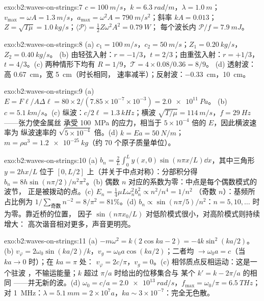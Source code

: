 \begin{solution}{exo:b2:waves-on-strings:7}
$c = \qty{100}{m/s}$，$k = \qty{6.3}{rad/m}$，$\lambda = \qty{1.0}{m}$；$v_{\max} = \omega A =
\qty{1.3}{m/s}$，$a_{\max} = \omega^2A = \qty{790}{m/s^2}$；斜率 $kA = 0.013$；$Z =
\sqrt{T\mu} = \qty{1.0}{kg/s}$；$\langle\mathcal P\rangle = \tfrac12Z\omega^2A^2 = \qty{0.79}{W}$；
每个波长内 $\mathcal P/f = \qty{7.9}{mJ}$。
\end{solution}

\begin{solution}{exo:b2:waves-on-strings:8}
(a) $c_1 = \qty{100}{m/s}$，$c_2 = \qty{50}{m/s}$；$Z_1 = \qty{0.20}{kg/s}$，$Z_2 = \qty{0.40}{kg/s}$。
(b) 由轻弦入射：$r = -1/3$，$t = 2/3$；由重弦入射：$r =
+1/3$，$t = 4/3$。(c) 两种情形下均有 $R = 1/9$，$\mathcal T = 4 \times 0.08/0.36 = 8/9$。
(d) 透射波：高 \qty{0.67}{cm}，宽 \qty{5}{cm}（时长相同，
速率减半）；反射波：\qty{-0.33}{cm}，\qty{10}{cm}。
\end{solution}

\begin{solution}{exo:b2:waves-on-strings:9}
(a) $E = F\ell/A\Delta\ell = 80 \times 2/(7.85 \times 10^{-7} \times 10^{-3}) = \qty{2.0e11}{Pa}$。
(b) $c = \qty{5.1}{km/s}$。(c) 纵波：$c/2\ell = \qty{1.3}{kHz}$；横波
$\sqrt{T/\mu} = \qty{114}{m/s}$，$f = \qty{29}{Hz}$ ——张力使金属丝
承受 \qty{100}{MPa} 的应力，相当于 $5 \times 10^{-4}$ 倍的 $E$，因此横波速率为
纵波速率的 $\sqrt{5 \times 10^{-4}}$ 倍。(d) $k = Ea = \qty{50}{N/m}$；$m
= \rho a^3 = \qty{1.2e-25}{kg}$（约 $70$ 个原子质量单位）。
\end{solution}

\begin{solution}{exo:b2:waves-on-strings:10}
(a) $b_n = \frac2L\int_0^Ly(x, 0)\sin(n\pi x/L)\dd x$，其中三角形 $y =
2hx/L$ 位于 $[0, L/2]$ 上（并关于中点对称）：分部积分得 $b_n = 8h\sin(n\pi/2)
/n^2\pi^2$。(b) 偶数 $n$ 对应的系数为零：中点是每个偶数模式的波节，
正是被拨动的点。(c) $E_n = \tfrac14\mu L\omega_n^2b_n^2 \propto n^2/n^4 = 1/n^2$
（奇数 $n$）：基频所占比例为 $1/\sum_{\text{奇数}}n^{-2} = 8/\pi^2 = 81\%$。(d)
$b_n \propto \sin(n\pi/5)/n^2$：$n = 5, 10, \dots$ 时为零。靠近桥的位置，
因子 $\sin(n\pi x_0/L)$ 对低阶模式很小，对高阶模式则持续增大：
高次谐音相对更多，声音更明亮。
\end{solution}

\begin{solution}{exo:b2:waves-on-strings:11}
(a) $-m\omega^2 = k(2\cos ka - 2) = -4k\sin^2(ka/2)$。(b) $v_\varphi = 2\omega_0\sin(ka/2)
/k$，$v_g = \omega_0a\cos(ka/2)$；二者均 $\to \omega_0a = c$（当 $ka \to 0$ 时）；在 $ka = \pi$ 处：
$v_\varphi = 2c/\pi$，$v_g = 0$。(c) 相邻质点反相运动：这是一个驻波
，不输运能量；$k$ 超过 $\pi/a$ 时给出的位移集合与
某个 $k' = k - 2\pi/a$ 的相同 ——并无新的波。(d) $\omega_0 = c/a =
\qty{2.0e13}{rad/s}$，$f_{\max} = \omega_0/\pi = \qty{6.5}{THz}$；对 \qty{1}{MHz}：$\lambda =
\qty{5.1}{mm} = 2 \times 10^7a$，$ka \sim 3 \times 10^{-7}$：完全无色散。
\end{solution}


